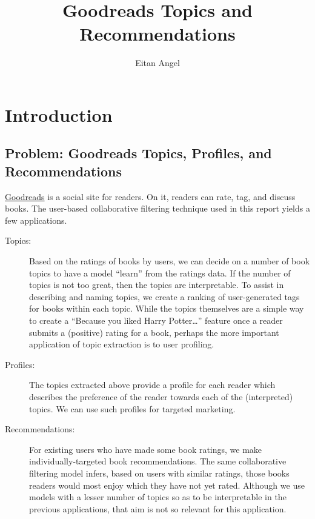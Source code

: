 \documentclass[11pt]{article}
\title{Goodreads Topics and Recommendations}
\author{Eitan Angel}
\begin{document}
    	
    
    \maketitle
 
\tableofcontents

\listoffigures 

\listoftables
 
 \newpage
 
     \hypertarget{introduction}{%
\section{Introduction}\label{introduction}}


    \hypertarget{problem}{%
\subsection{Problem: Goodreads Topics, Profiles, and Recommendations}\label{problem}}

\href{https://www.goodreads.com}{Goodreads} is a social site for readers. On it, readers can rate, tag, and discuss books. The user-based collaborative filtering technique used in this report yields a few applications.

\begin{description}
\item[Topics:] Based on the ratings of books by users, we can decide on a number of book topics to have a model ``learn'' from the ratings data. If the number of topics is not too great, then the topics are interpretable. To assist in describing and naming topics, we create a ranking of user-generated tags for books within each topic. While the topics themselves are a simple way to create a ``Because you liked Harry Potter\ldots'' feature once a reader submits a (positive) rating for a book,  perhaps the more important application of topic extraction is to user profiling.
\item[Profiles:] The topics extracted above provide a profile for each reader which describes the preference of the reader towards each of the (interpreted) topics. We can use such profiles for targeted marketing.
\item[Recommendations:] For existing users who have made some book ratings, we make individually-targeted book recommendations. The same collaborative filtering model infers, based on users with similar ratings, those books readers would most enjoy which they have not yet rated. Although we use models with a lesser number of topics so as to be interpretable in the previous applications, that aim is not so relevant for this application.
\end{description}
\end{document}
